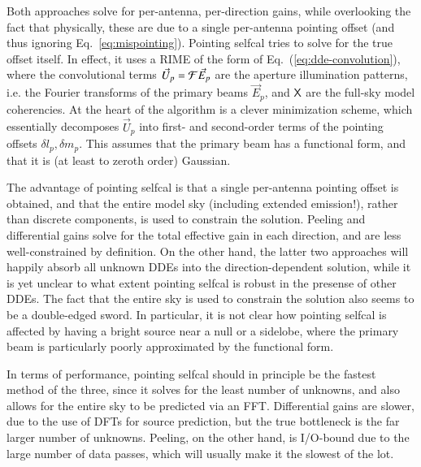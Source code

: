 \documentclass[referee]{aa}
\newcommand{\jones}[2]{\vec {#1}_{#2}}
\newcommand{\coh}[2]{\mathsf{{#1}}_{{#2}}}
\begin{document}
Both approaches solve for per-antenna, per-direction gains, while overlooking the fact that physically, these are due to a single per-antenna pointing offset (and thus ignoring Eq.~\ref{eq:mispointing}). Pointing selfcal tries to solve for the true offset itself. In effect, it uses a RIME of the form of Eq.~(\ref{eq:dde-convolution}), where the convolutional terms $\jones{U}{p}={\cal F}\jones{E}{p}$ are the aperture illumination patterns, i.e. the Fourier transforms of the primary beams $\jones{E}{p}$, and $\coh{X}{}$ are the full-sky model coherencies. At the heart of the algorithm is a clever minimization scheme, which essentially decomposes $\jones{U}{p}$ into first- and second-order terms of the pointing offsets $\delta l_p,\delta m_p$. This assumes that the primary beam has a functional form, and that it is (at least to zeroth order) Gaussian. 

The advantage of pointing selfcal is that a single per-antenna pointing offset is obtained, and that the entire model sky (including extended emission!), rather than discrete components, is used to constrain the solution. Peeling and differential gains solve for the total effective gain in each direction, and are less well-constrained by definition. On the other hand, the latter two approaches will happily absorb all unknown DDEs into the direction-dependent solution, while it is yet unclear to what extent pointing selfcal is robust in the presense of other DDEs. The fact that the entire sky is used to constrain the solution also seems to be a double-edged sword. In particular, it is not clear how pointing selfcal is affected by having a bright source near a null or a sidelobe, where the primary beam is particularly poorly approximated by the functional form. 

In terms of performance, pointing selfcal should in principle be the fastest method of the three, since it solves for the least number of unknowns, and also allows for the entire sky to be predicted via an FFT. Differential gains are slower, due to the use of DFTs for source prediction, but the true bottleneck is the far larger number of unknowns. Peeling, on the other hand, is I/O-bound due to the large number of data passes, which will usually make it the slowest of the lot. 
\end{document}
